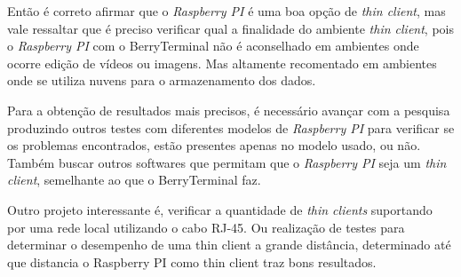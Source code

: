 \documentclass[
	12pt,				%
	openright,			%
	twoside,			%
	a4paper,			%
	chapter=TITLE,		%
	english,			%
	brazil				%
	]{abntex2}
\begin{document}
Então é correto afirmar que o \textit{Raspberry PI} é uma boa opção de \textit{thin client}, mas vale ressaltar que é preciso verificar qual a finalidade do ambiente \textit{thin client}, pois o \textit{Raspberry PI} com o BerryTerminal não é aconselhado em ambientes onde ocorre edição de vídeos ou imagens. Mas altamente recomentado em ambientes onde se utiliza nuvens para o armazenamento dos dados.

Para a obtenção de resultados mais precisos, é necessário avançar com a pesquisa produzindo outros testes com diferentes modelos de \textit{Raspberry PI} para verificar se os problemas encontrados, estão presentes apenas no modelo usado, ou não. Também buscar outros softwares que permitam que o \textit{Raspberry PI} seja um \textit{thin client}, semelhante ao que o BerryTerminal faz.

Outro projeto interessante é, verificar a quantidade de \textit{thin clients} suportando por uma rede local utilizando o cabo RJ-45. Ou realização de testes para determinar o desempenho de uma thin client a grande distância, determinado até que distancia o Raspberry PI como thin client traz bons resultados.  









\postextual






\end{document}
